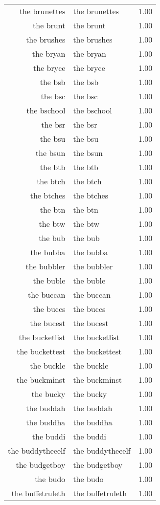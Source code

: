 \begin{table}[ht]
\begin{tabular}{rlr}
  the brunettes & the brunettes & 1.00 \\ 
  the brunt & the brunt & 1.00 \\ 
  the brushes & the brushes & 1.00 \\ 
  the bryan & the bryan & 1.00 \\ 
  the bryce & the bryce & 1.00 \\ 
  the bsb & the bsb & 1.00 \\ 
  the bsc & the bsc & 1.00 \\ 
  the bschool & the bschool & 1.00 \\ 
  the bsr & the bsr & 1.00 \\ 
  the bsu & the bsu & 1.00 \\ 
  the bsun & the bsun & 1.00 \\ 
  the btb & the btb & 1.00 \\ 
  the btch & the btch & 1.00 \\ 
  the btches & the btches & 1.00 \\ 
  the btn & the btn & 1.00 \\ 
  the btw & the btw & 1.00 \\ 
  the bub & the bub & 1.00 \\ 
  the bubba & the bubba & 1.00 \\ 
  the bubbler & the bubbler & 1.00 \\ 
  the buble & the buble & 1.00 \\ 
  the buccan & the buccan & 1.00 \\ 
  the buccs & the buccs & 1.00 \\ 
  the bucest & the bucest & 1.00 \\ 
  the bucketlist & the bucketlist & 1.00 \\ 
  the buckettest & the buckettest & 1.00 \\ 
  the buckle & the buckle & 1.00 \\ 
  the buckminst & the buckminst & 1.00 \\ 
  the bucky & the bucky & 1.00 \\ 
  the buddah & the buddah & 1.00 \\ 
  the buddha & the buddha & 1.00 \\ 
  the buddi & the buddi & 1.00 \\ 
  the buddytheeelf & the buddytheeelf & 1.00 \\ 
  the budgetboy & the budgetboy & 1.00 \\ 
  the budo & the budo & 1.00 \\ 
  the buffetruleth & the buffetruleth & 1.00 \\ 

\end{tabular}
\end{table}
